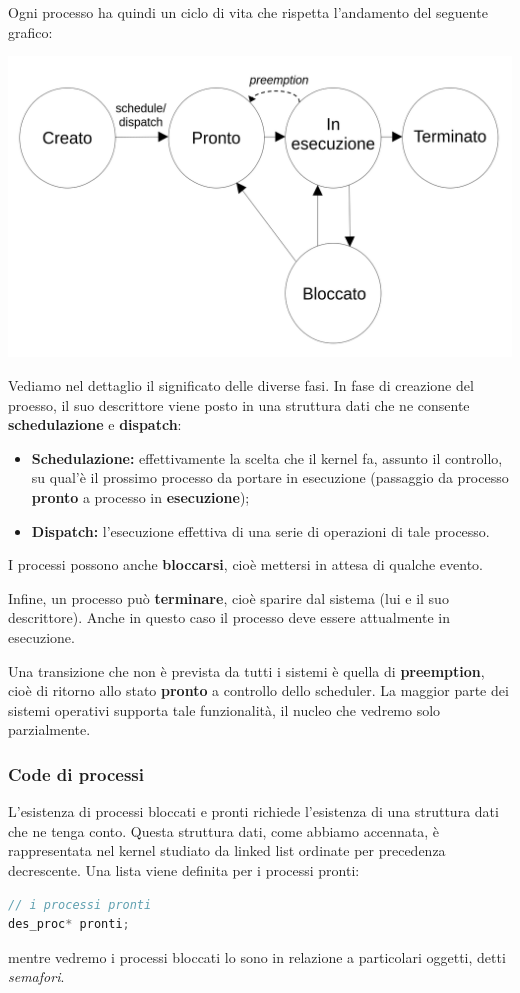 \documentclass[a4paper,11pt]{article}
\begin{document}
Ogni processo ha quindi un ciclo di vita che rispetta l'andamento del seguente grafico:
\begin{center}
	\includegraphics[scale=0.3]{../figures/schema_proc.png}
\end{center}

Vediamo nel dettaglio il significato delle diverse fasi.
In fase di creazione del proesso, il suo descrittore viene posto in una struttura dati che ne consente \textbf{schedulazione} e \textbf{dispatch}:
\begin{itemize}
	\item \textbf{Schedulazione:} effettivamente la scelta che il kernel fa, assunto il controllo, su qual'è il prossimo processo da portare in esecuzione (passaggio da processo \textbf{pronto} a processo in \textbf{esecuzione});
	\item \textbf{Dispatch:} l'esecuzione effettiva di una serie di operazioni di tale processo. 
\end{itemize}

I processi possono anche \textbf{bloccarsi}, cioè mettersi in attesa di qualche evento. 

Infine, un processo può \textbf{terminare}, cioè sparire dal sistema (lui e il suo descrittore).
Anche in questo caso il processo deve essere attualmente in esecuzione.

Una transizione che non è prevista da tutti i sistemi è quella di \textbf{preemption}, cioè di ritorno allo stato \textbf{pronto} a controllo dello scheduler.
La maggior parte dei sistemi operativi supporta tale funzionalità, il nucleo che vedremo solo parzialmente.

\subsubsection{Code di processi}
L'esistenza di processi bloccati e pronti richiede l'esistenza di una struttura dati che ne tenga conto.
Questa struttura dati, come abbiamo accennata, è rappresentata nel kernel studiato da linked list ordinate per precedenza decrescente.
Una lista viene definita per i processi pronti:
\begin{lstlisting}[language=C++, style=codestyle]	
// i processi pronti
des_proc* pronti;
\end{lstlisting}
mentre vedremo i processi bloccati lo sono in relazione a particolari oggetti, detti \textit{semafori}.
\end{document}
